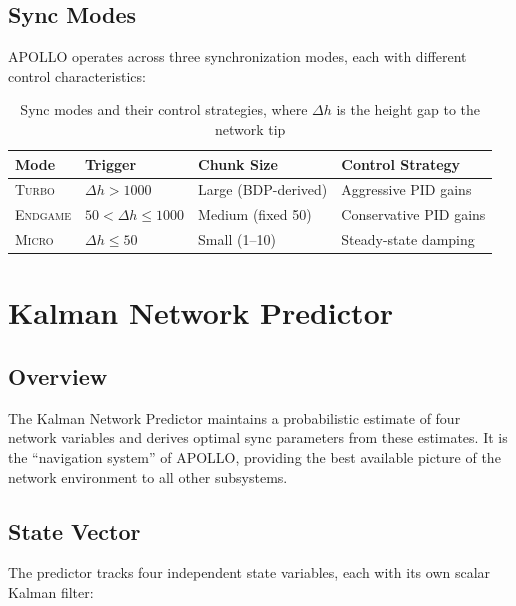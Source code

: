 \documentclass[11pt,a4paper]{article}
\begin{document}
\subsection{Sync Modes}

APOLLO operates across three synchronization modes, each with different control characteristics:

\begin{table}[h]
\centering
\begin{tabular}{llll}
\toprule
\textbf{Mode} & \textbf{Trigger} & \textbf{Chunk Size} & \textbf{Control Strategy} \\
\midrule
\textsc{Turbo} & $\Delta h > 1000$ & Large (BDP-derived) & Aggressive PID gains \\
\textsc{Endgame} & $50 < \Delta h \leq 1000$ & Medium (fixed 50) & Conservative PID gains \\
\textsc{Micro} & $\Delta h \leq 50$ & Small (1--10) & Steady-state damping \\
\bottomrule
\end{tabular}
\caption{Sync modes and their control strategies, where $\Delta h$ is the height gap to the network tip}
\label{tab:modes}
\end{table}

\section{Kalman Network Predictor}
\label{sec:kalman}

\subsection{Overview}

The Kalman Network Predictor maintains a probabilistic estimate of four network variables and derives optimal sync parameters from these estimates. It is the ``navigation system'' of APOLLO, providing the best available picture of the network environment to all other subsystems.

\subsection{State Vector}

The predictor tracks four independent state variables, each with its own scalar Kalman filter:
\end{document}
